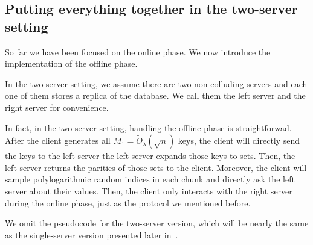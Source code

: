

\subsection{Putting everything together in the two-server setting}



So far we have been focused on the online phase.
We now introduce the implementation of the offline phase.

In the two-server setting, we assume there are two non-colluding servers and each one of them stores a replica of the database.
We call them the left server and the right server for convenience.

In fact, in the two-server setting, handling the offline phase is straightforwad.
After the client generates all $M_1=\widetilde{O}_\lambda(\sqrt{n})$ keys, 
the client will directly send the keys to the left server the left server expands those keys 
to sets.
Then, the left server returns the parities of those sets to the client.
Moreover, the client will sample polylogarithmic random indices in each chunk
and directly ask the left server about their values.
Then, the client only interacts with the right server during the online phase, just as the protocol we mentioned before.

We omit the pseudocode for the two-server version, which will be nearly the same as the single-server version presented later in~. 

